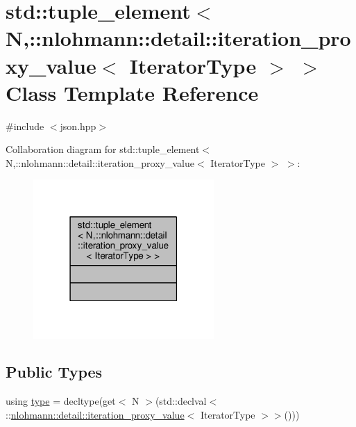 \hypertarget{classstd_1_1tuple__element_3_01N_00_1_1nlohmann_1_1detail_1_1iteration__proxy__value_3_01IteratorType_01_4_01_4}{}\section{std\+:\+:tuple\+\_\+element$<$ N,\+:\+:nlohmann\+:\+:detail\+:\+:iteration\+\_\+proxy\+\_\+value$<$ Iterator\+Type $>$ $>$ Class Template Reference}
\label{classstd_1_1tuple__element_3_01N_00_1_1nlohmann_1_1detail_1_1iteration__proxy__value_3_01IteratorType_01_4_01_4}


{\ttfamily \#include $<$json.\+hpp$>$}



Collaboration diagram for std\+:\+:tuple\+\_\+element$<$ N,\+:\+:nlohmann\+:\+:detail\+:\+:iteration\+\_\+proxy\+\_\+value$<$ Iterator\+Type $>$ $>$\+:
\nopagebreak
\begin{figure}[H]
\begin{center}
\leavevmode
\includegraphics[width=195pt]{classstd_1_1tuple__element_3_01N_00_1_1nlohmann_1_1detail_1_1iteration__proxy__value_3_01IteratorType_01_4_01_4__coll__graph}
\end{center}
\end{figure}
\subsection*{Public Types}
\begin{DoxyCompactItemize}
\item 
using \hyperlink{classstd_1_1tuple__element_3_01N_00_1_1nlohmann_1_1detail_1_1iteration__proxy__value_3_01IteratorType_01_4_01_4_a9469c97fd711b823af47c1ff75a09ada}{type} = decltype(get$<$ N $>$(std\+::declval$<$ \+::\hyperlink{classnlohmann_1_1detail_1_1iteration__proxy__value}{nlohmann\+::detail\+::iteration\+\_\+proxy\+\_\+value}$<$ Iterator\+Type $>$$>$()))
\end{DoxyCompactItemize}


